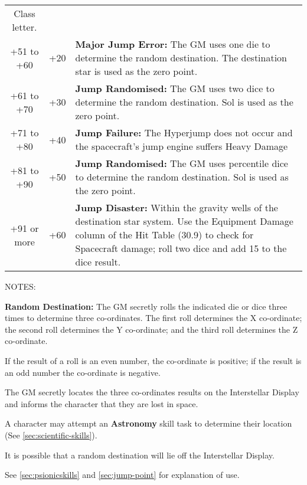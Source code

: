 \begin{table}[htbp]
{\begin{minipage}{5.7in}
\begin{tabular}{crp{3.5in}}
        Class letter. \\
        +51 to +60 & +20 &
        \textbf{Major Jump Error:} The GM uses one die to 
        determine the random destination. The destination 
        star is used as the zero point. \\
        +61 to +70 & +30 &
        \textbf{Jump Randomised:} The GM uses two dice to 
        determine the random destination. Sol is used as 
        the zero point. \\
        +71 to +80 & +40 & 
        \textbf{Jump Failure:} The Hyperjump does not occur and 
        the spacecraft's jump engine suffers Heavy Damage \\
        +81 to +90 & +50 &
        \textbf{Jump Randomised:} The GM uses percentile dice 
        to determine the random destination. Sol is used as 
        the zero point. \\
        +91 or more & +60 &
        \textbf{Jump Disaster:} Within the gravity wells of the 
        destination star system. Use the Equipment 
        Damage column of the Hit Table (30.9) to check for 
        Spacecraft damage; roll two dice and add 15 to the 
        dice result. 
      \end{tabular}
      \parbox{\textwidth}{NOTES: 

        \textbf{Random Destination:} The GM secretly rolls 
        the indicated die or dice three times to 
        determine three co-ordinates. The first roll 
        determines the X co-ordinate; the second roll 
        determines the Y co-ordinate; and the third 
        roll determines the Z co-ordinate. 

        If the result of a roll is an even number, the 
        co-ordinate is positive; if the result is an odd 
        number the co-ordinate is negative. 

        The GM secretly locates the three co-ordinates results on the
        Interstellar Display  
        and informs the character that they are lost in 
        space. 

        A character may attempt an \textbf{Astronomy} skill 
        task to determine their location (See
        \ref{sec:scientific-skills}). 

        It is possible that a random destination will lie 
        off the Interstellar Display. 

        See \ref{sec:psionicskills} and \ref{sec:jump-point} for
        explanation of use.}
    \end{minipage}}
\end{table}

